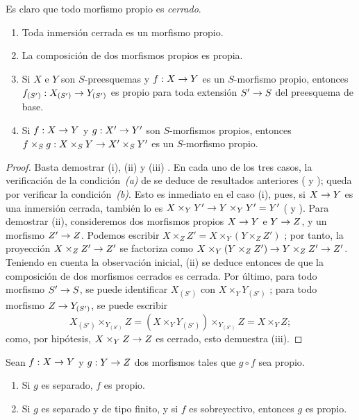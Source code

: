 \documentclass[oneside,10pt]{amsart}
\makeatletter
\newcommand{\ega@arrow}[2]{\mathchoice{#1}{#2}{#2}{#2}}
\renewcommand{\to}{\ega@arrow{\longrightarrow}{\rightarrow}}
\newcommand{\oldpage}[2][]{\marginnote{\normalfont\footnotesize\textbf{#1}~|~#2}\ignorespaces}
\let\EGAOriginalLabel\label
\renewcommand{\label}[1]{\phantomsection\EGAOriginalLabel{#1}}
\makeatother
\begin{document}
Es claro que todo morfismo propio es \emph{cerrado}.

\begin{proposition}[5.4.2]
\label{II.5.4.2}
\medskip\noindent
\begin{enumerate}
  \item[{\rm(i)}] Toda inmersión cerrada es un morfismo propio.
  \item[{\rm(ii)}] La composición de dos morfismos propios es propia.
  \item[{\rm(iii)}] Si $X$ e $Y$ son $S$-preesquemas y $f:X\to Y$ es un $S$-morfismo propio, entonces $f_{(S')}:X_{(S')}\to Y_{(S')}$ es propio para toda extensión $S'\to S$ del preesquema de base.
  \item[{\rm(iv)}] Si $f:X\to Y$ y $g:X'\to Y'$ son $S$-morfismos propios, entonces $f\times_S g:X\times_S Y\to X'\times_S Y'$ es un $S$-morfismo propio.
\end{enumerate}
\end{proposition}

\oldpage[II]{101}
\begin{proof}
Basta demostrar (i), (ii) y (iii) .
En cada uno de los tres casos, la verificación de la condición~\emph{(a)} de  se deduce de resultados anteriores ( y ); queda por verificar la condición~\emph{(b)}.
Esto es inmediato en el caso (i), pues, si $X\to Y$ es una inmersión cerrada, también lo es $X\times_Y Y'\to Y\times_Y Y'=Y'$ ( y ).
Para demostrar (ii), consideremos dos morfismos propios $X\to Y$ e $Y\to Z$, y un morfismo $Z'\to Z$.
Podemos escribir $X\times_Z Z'=X\times_Y(Y\times_Z Z')$ ; por tanto, la proyección $X\times_Z Z'\to Z'$ se factoriza como $X\times_Y(Y\times_Z Z')\to Y\times_Z Z'\to Z'$.
Teniendo en cuenta la observación inicial, (ii) se deduce entonces de que la composición de dos morfismos cerrados es cerrada.
Por último, para todo morfismo $S'\to S$, se puede identificar $X_{(S')}$ con $X\times_Y Y_{(S')}$ ; para todo morfismo $Z\to Y_{(S')}$, se puede escribir
\[
  X_{(S')}\times_{Y_{(S')}}Z=(X\times_Y Y_{(S')})\times_{Y_{(S')}}Z=X\times_Y Z;
\]
como, por hipótesis, $X\times_Y Z\to Z$ es cerrado, esto demuestra (iii).
\end{proof}

\begin{corollary}[5.4.3]
\label{II.5.4.3}
Sean $f:X\to Y$ y $g:Y\to Z$ dos morfismos tales que $g\circ f$ sea propio.
\begin{enumerate}
  \item[{\rm(i)}] Si $g$ es separado, $f$ es propio.
  \item[{\rm(ii)}] Si $g$ es separado y de tipo finito, y si $f$ es sobreyectivo, entonces $g$ es propio.
\end{enumerate}
\end{corollary}
\end{document}
